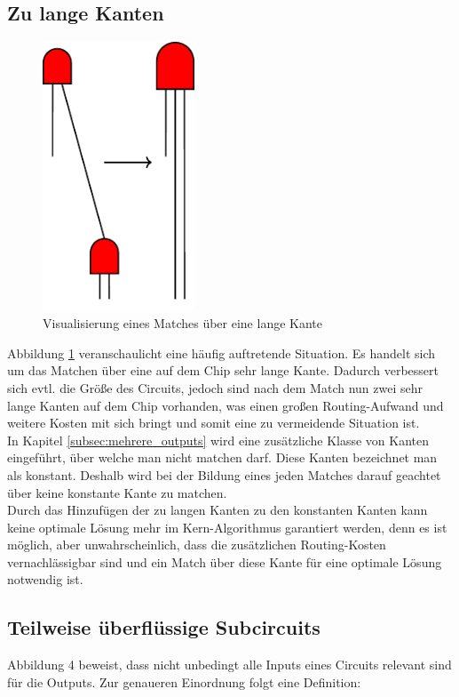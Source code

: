 \documentclass[11pt, a4paper, german]{article}
\begin{document}
\newpage
\subsection{Zu lange Kanten}
\label{subsec:zu_lange_kanten}
 \begin{figure}
		\includegraphics[height = 8cm]{pictures/compiled/zu_lange_kante}
		\caption{Visualisierung eines Matches über eine lange Kante}
		\label{bild:zu_lange_kanten}
\end{figure}
Abbildung \ref{bild:zu_lange_kanten} veranschaulicht eine häufig auftretende Situation. Es handelt sich um das Matchen über eine auf dem Chip sehr lange Kante. Dadurch verbessert sich evtl. die Größe des Circuits, jedoch sind nach dem Match nun zwei sehr lange Kanten auf dem Chip vorhanden, was einen großen Routing-Aufwand und weitere Kosten mit sich bringt und somit eine zu vermeidende Situation ist. \\
In Kapitel \ref{subsec:mehrere_outputs} wird eine zusätzliche Klasse von Kanten eingeführt, über welche man nicht matchen darf.
Diese Kanten bezeichnet man als konstant.
Deshalb wird bei der Bildung eines jeden Matches darauf geachtet über keine konstante Kante zu matchen.\\
Durch das Hinzufügen der zu langen Kanten zu den konstanten Kanten kann keine optimale Lösung mehr im Kern-Algorithmus garantiert werden, denn es ist möglich, aber unwahrscheinlich, dass die zusätzlichen Routing-Kosten vernachlässigbar sind und ein Match über diese Kante für eine optimale Lösung notwendig ist. \\

 \subsection{Teilweise überflüssige Subcircuits}
 \label{subsec:teilweise_ueberfkl_subcircuits}
 Abbildung 4 beweist, dass nicht unbedingt alle Inputs eines Circuits relevant sind für die Outputs. Zur genaueren Einordnung folgt eine Definition:
 
\end{document}
